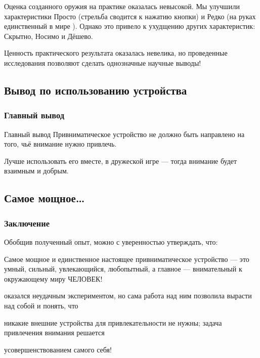 Оценка созданного оружия на практике оказалась невысокой. Мы улучшили характеристики \alert{Просто} (стрельба сводится к нажатию кнопки) и \alert{Редко} (на руках единственный в мире {\myDevice}). Однако это привело к ухудщению других характеристик: Скрытно, Носимо и Дёшево.

Ценность практического результата оказалась невелика, но проведенные исследования позволяют сделать однозначные научные выводы!


\subsection{Вывод по использованию устройства}

\begin{frame}
    \frametitle{Главный вывод}
    
    \begin{block}{Главный вывод}
        Привниматическое устройство \alert{не должно} быть направлено на того, чьё внимание нужно привлечь. 
    \end{block}
    
    \par\bigskip
    
    Лучше использовать его вместе, в дружеской игре --- тогда внимание будет \alert{взаимным} и \alert{добрым}.
\end{frame}


\subsection{Самое мощное\ldots}

\begin{frame}
    \frametitle{Заключение}
    
    Обобщив полученный опыт, можно с уверенностью утверждать, что:
    
    \begin{block}{}
        Самое мощное и \alert{единственное настоящее} привниматическое устройство --- это умный, сильный, увлекающийся, любопытный, а главное --- \alert{внимательный} к окружающему миру \alert{ЧЕЛОВЕК}!
    \end{block}
    
    {\myDevice} оказался неудачным экспериментом, но сама работа над ним позволила вырасти над собой и понять, что

    \begin{block}{}
        никакие внешние устройства для привлекательности не нужны; задача привлечения внимания решается 
        \begin{center}
            \alert{усовершенствованием самого себя}!
        \end{center}
    \end{block}
\end{frame}

